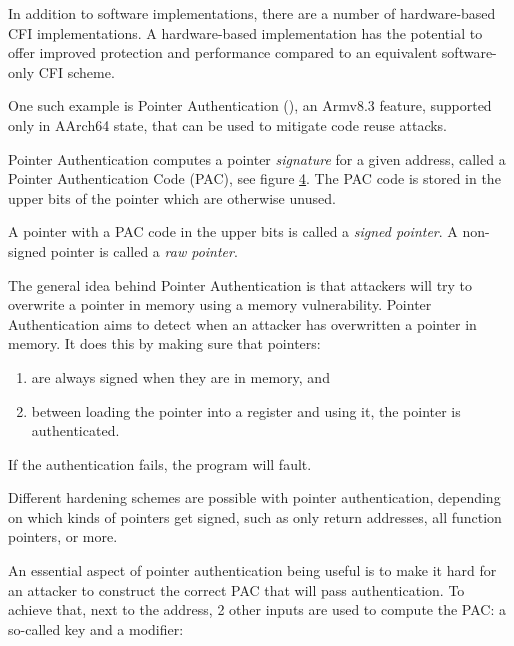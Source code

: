 \documentclass[
  a4paper,
]{report}
\providecommand{\tightlist}{%
  \setlength{\itemsep}{0pt}\setlength{\parskip}{0pt}}
\begin{document}
In addition to software implementations, there are a number of
hardware-based CFI implementations. A hardware-based implementation has
the potential to offer improved protection and performance compared to
an equivalent software-only CFI scheme.

One such example is \label{__index_entry_50}{Pointer
Authentication}
(), an Armv8.3 feature,
supported only in AArch64 state, that can be used to mitigate code reuse
attacks.

Pointer Authentication computes a pointer \emph{signature} for a given
address, called a \label{__index_entry_51}{Pointer
Authentication Code (PAC)}, see
figure \hyperref[fig:pauth-sign-auth]{4}. The PAC code is stored in the
upper bits of the pointer which are otherwise unused.

A pointer with a PAC code in the upper bits is called a
\emph{\label{__index_entry_52}{signed
pointer}}. A non-signed pointer is called a
\emph{\label{__index_entry_53}{raw
pointer}}.

The general idea behind Pointer Authentication is that attackers will
try to overwrite a pointer in memory using a memory vulnerability.
Pointer Authentication aims to detect when an attacker has overwritten a
pointer in memory. It does this by making sure that pointers:

\begin{enumerate}
\def\labelenumi{\arabic{enumi}.}
\tightlist
\item
  are always signed when they are in memory, and
\item
  between loading the pointer into a register and using it, the pointer
  is authenticated.
\end{enumerate}

If the authentication fails, the program will fault.

Different hardening schemes are possible with pointer authentication,
depending on which kinds of pointers get signed, such as only return
addresses, all function pointers, or more.

An essential aspect of pointer authentication being useful is to make it
hard for an attacker to construct the correct PAC that will pass
authentication. To achieve that, next to the address, 2 other inputs are
used to compute the PAC: a so-called
\label{__index_entry_54}{key} and a
\label{__index_entry_55}{modifier}:
\end{document}
